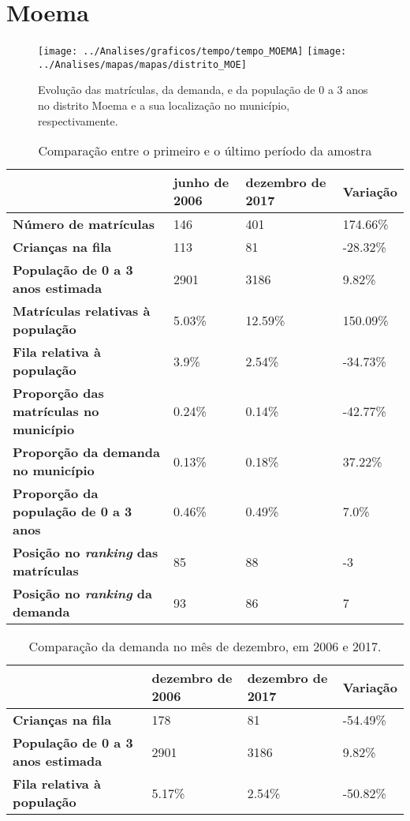 \section{Moema}
\begin{figure}[H]
\centering
\texttt{[image: ../Analises/graficos/tempo/tempo\_MOEMA]}
\texttt{[image: ../Analises/mapas/mapas/distrito\_MOE]}
\caption{Evolução das matrículas, da demanda, e da população de 0 a 3 anos no distrito Moema e a sua localização no município, respectivamente.}
\end{figure}
\begin{table}[H]
\begin{tabular}{l|l|l|l}
\textbf{}                                      & \textbf{junho de 2006}       & \textbf{dezembro de 2017}    & \textbf{Variação} \\ \hline
\textbf{Número de matrículas}                  & 146 & 401 & 174.66\% \\ \hline
\textbf{Crianças na fila}                      & 113 & 81 & -28.32\% \\ \hline
\textbf{População de 0 a 3 anos estimada}      & 2901 & 3186 & 9.82\% \\ \hline
\textbf{Matrículas relativas à população}      & 5.03\% & 12.59\% & 150.09\% \\ \hline
\textbf{Fila relativa à população}             & 3.9\% & 2.54\% & -34.73\% \\ \hline
\textbf{Proporção das matrículas no município} & 0.24\% & 0.14\% & -42.77\% \\ \hline
\textbf{Proporção da demanda no município}     & 0.13\% & 0.18\% & 37.22\% \\ \hline
\textbf{Proporção da população de 0 a 3 anos}  & 0.46\% & 0.49\% & 7.0\% \\ \hline
\textbf{Posição no \textit{ranking} das matrículas}     & 85 & 88 & -3 \\ \hline
\textbf{Posição no \textit{ranking} da demanda}         & 93 & 86 & 7 \\ 
\end{tabular}
\caption{Comparação entre o primeiro e o último período da amostra}
\end{table}
\begin{table}[H]
\begin{tabular}{l|l|l|l}
\textbf{}                                 & \textbf{dezembro de 2006} & \textbf{dezembro de 2017} & \textbf{Variação} \\ \hline
\textbf{Crianças na fila}                      & 178 & 81 & -54.49\% \\ \hline
\textbf{População de 0 a 3 anos estimada}      & 2901 & 3186 & 9.82\% \\ \hline
\textbf{Fila relativa à população}             & 5.17\% & 2.54\% & -50.82\% \\
\end{tabular}
\caption{Comparação da demanda no mês de dezembro, em 2006 e 2017.}
\end{table}
